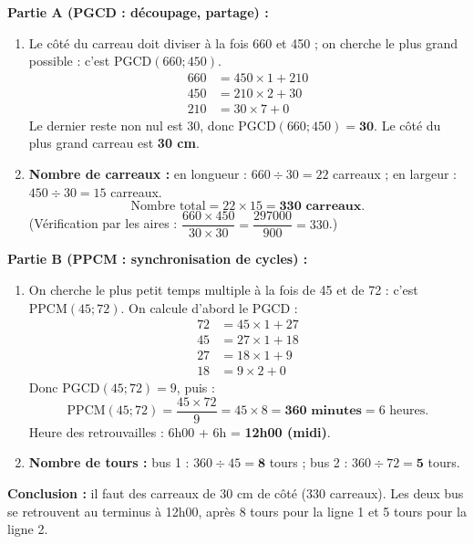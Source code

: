 \documentclass[11pt]{article}
\begin{document}
\begin{exoresolu}
\textbf{Partie A (PGCD : découpage, partage) :}
\begin{enumerate}
    \item Le côté du carreau doit diviser à la fois 660 et 450 ; on cherche le plus grand possible : c'est $\text{PGCD}(660; 450)$.
    \begin{align*}
    660 &= 450 \times 1 + 210 \\
    450 &= 210 \times 2 + 30 \\
    210 &= 30 \times 7 + 0
    \end{align*}
    Le dernier reste non nul est 30, donc $\text{PGCD}(660; 450) = \mathbf{30}$. Le côté du plus grand carreau est \textbf{30 cm}.
    \item \textbf{Nombre de carreaux :} en longueur : $660 \div 30 = 22$ carreaux ; en largeur : $450 \div 30 = 15$ carreaux.
    \[ \text{Nombre total} = 22 \times 15 = \mathbf{330 \text{ carreaux}}. \]
    (Vérification par les aires : $\dfrac{660 \times 450}{30 \times 30} = \dfrac{297000}{900} = 330$.)
\end{enumerate}
\textbf{Partie B (PPCM : synchronisation de cycles) :}
\begin{enumerate}
    \item On cherche le plus petit temps multiple à la fois de 45 et de 72 : c'est $\text{PPCM}(45; 72)$. On calcule d'abord le PGCD :
    \begin{align*}
    72 &= 45 \times 1 + 27 \\
    45 &= 27 \times 1 + 18 \\
    27 &= 18 \times 1 + 9 \\
    18 &= 9 \times 2 + 0
    \end{align*}
    Donc $\text{PGCD}(45; 72) = 9$, puis :
    \[ \text{PPCM}(45; 72) = \frac{45 \times 72}{9} = 45 \times 8 = \mathbf{360 \text{ minutes}} = 6 \text{ heures}. \]
    Heure des retrouvailles : 6h00 + 6h = \textbf{12h00 (midi)}.
    \item \textbf{Nombre de tours :}
    bus 1 : $360 \div 45 = \mathbf{8}$ tours ; bus 2 : $360 \div 72 = \mathbf{5}$ tours.
\end{enumerate}
\textbf{Conclusion :} il faut des carreaux de 30 cm de côté (330 carreaux). Les deux bus se retrouvent au terminus à 12h00, après 8 tours pour la ligne 1 et 5 tours pour la ligne 2.
\end{exoresolu}
\end{document}
